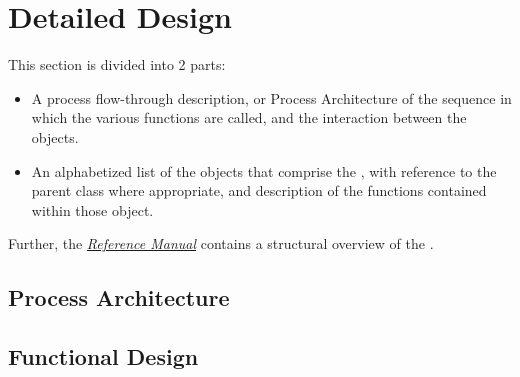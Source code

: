 
%
%
% 
%

\section{Detailed Design}

This section is divided into 2 parts:


\begin{itemize}
\item A process flow-through description, or Process Architecture of the sequence in which the
various functions are called, and the interaction between the objects.
\item An alphabetized list of the objects that comprise the
\ThermalRiderDesc, 
with reference to the parent class where appropriate, and description
of the functions contained within those object.
\end{itemize}

Further, the 
\href{file:refman.pdf} {\em Reference Manual} \cite{thermalbib:ReferenceManual}
contains a
structural overview of the \ThermalRiderDesc.

\subsection{Process Architecture}



\clearpage

\subsection{Functional Design}



